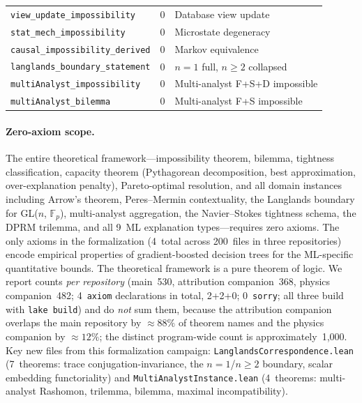 \documentclass[11pt,a4paper]{article}
\begin{document}
\begin{table}[ht]
\begin{tabular}{@{}lrl@{}}
\texttt{view\_update\_impossibility} & 0 & Database view update \\
\texttt{stat\_mech\_impossibility} & 0 & Microstate degeneracy \\
\texttt{causal\_impossibility\_derived} & 0 & Markov equivalence \\
\texttt{langlands\_boundary\_statement} & 0 & $n{=}1$ full, $n{\geq}2$ collapsed \\
\texttt{multiAnalyst\_impossibility} & 0 & Multi-analyst F+S+D impossible \\
\texttt{multiAnalyst\_bilemma} & 0 & Multi-analyst F+S impossible \\
\bottomrule
\end{tabular}
\end{table}

\paragraph{Zero-axiom scope.}
The entire theoretical framework---impossibility theorem, bilemma, tightness classification, capacity theorem (Pythagorean decomposition, best approximation, over-explanation penalty), Pareto-optimal resolution, and all domain instances including Arrow's theorem, Peres--Mermin contextuality, the Langlands boundary for GL($n$, $\mathbb{F}_p$), multi-analyst aggregation, the Navier--Stokes tightness schema, the DPRM trilemma, and all 9~ML explanation types---requires zero axioms.  The only axioms in the formalization (4~total across 200~files in three repositories) encode empirical properties of gradient-boosted decision trees for the ML-specific quantitative bounds.  The theoretical framework is a pure theorem of logic.  We report counts \emph{per repository}
(main~530, attribution companion~368, physics companion~482; 4~\texttt{axiom} declarations in
total, 2+2+0; 0~\texttt{sorry}; all three build with \texttt{lake build}) and do \emph{not} sum
them, because the attribution companion overlaps the main repository by ${\approx}88\%$ of theorem
names and the physics companion by ${\approx}12\%$; the distinct program-wide count is
approximately~1{,}000.  Key new files from this formalization campaign: \texttt{LanglandsCorrespondence.lean} (7~theorems: trace conjugation-invariance, the $n{=}1$/$n{\geq}2$ boundary, scalar embedding functoriality) and \texttt{MultiAnalystInstance.lean} (4~theorems: multi-analyst Rashomon, trilemma, bilemma, maximal incompatibility).
\end{document}
